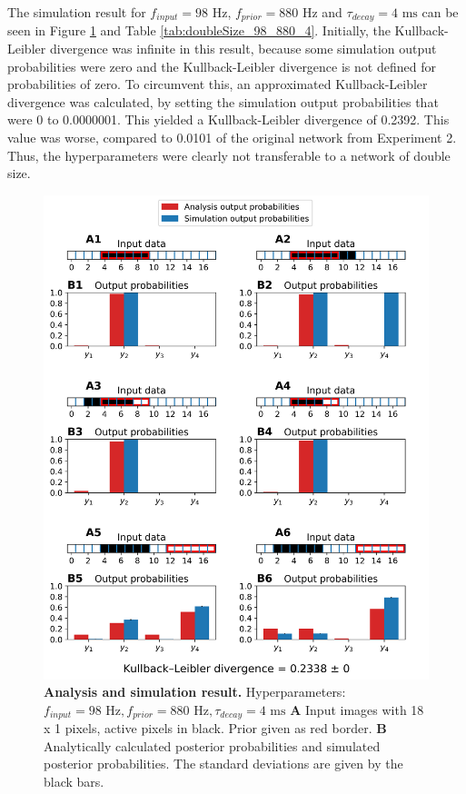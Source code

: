 The simulation result for $f_{input} = 98\text{ Hz}$, $f_{prior} = 880\text{ Hz}$ and $\tau_{decay} = 4\text{ ms}$ can be seen in Figure \ref{fig:doubleSize_98_880_4} and Table \ref{tab:doubleSize_98_880_4}. Initially, the Kullback-Leibler divergence was infinite in this result, because some simulation output probabilities were zero and the Kullback-Leibler divergence is not defined for probabilities of zero. To circumvent this, an approximated Kullback-Leibler divergence was calculated, by setting the simulation output probabilities that were 0 to 0.0000001. This yielded a Kullback-Leibler divergence of 0.2392. This value was worse, compared to 0.0101 of the original network from Experiment 2. Thus, the hyperparameters were clearly not transferable to a network of double size.
\begin{figure}
  \includegraphics[width=\linewidth]{figures/1D/doubleSize/doubleSize_98_880_4.png}
      \caption{\textbf{Analysis and simulation result. } Hyperparameters: $f_{input} = 98\text{ Hz}, f_{prior} = 880\text{ Hz}, \tau_{decay} = 4\text{ ms}$ \textbf{A} Input images with 18 x 1 pixels, active pixels in black. Prior given as red border. \textbf{B} Analytically calculated posterior probabilities and simulated posterior probabilities. The standard deviations are given by the black bars.}
  \label{fig:doubleSize_98_880_4}
\end{figure}

